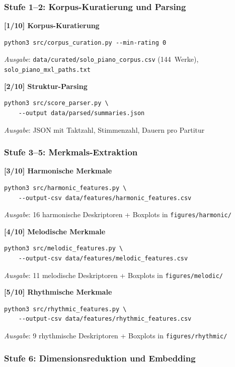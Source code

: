 \documentclass[12pt,a4paper]{article}
\theoremstyle{definition}
\begin{document}
\subsubsection{Stufe 1--2: Korpus-Kuratierung und Parsing}

\textbf{[1/10] Korpus-Kuratierung}
\begin{lstlisting}
python3 src/corpus_curation.py --min-rating 0
\end{lstlisting}
\textit{Ausgabe}: \texttt{data/curated/solo\_piano\_corpus.csv} (144~Werke), \newline\texttt{solo\_piano\_mxl\_paths.txt}

\textbf{[2/10] Struktur-Parsing}
\begin{lstlisting}
python3 src/score_parser.py \
    --output data/parsed/summaries.json
\end{lstlisting}
\textit{Ausgabe}: JSON mit Taktzahl, Stimmenzahl, Dauern pro Partitur

\subsubsection{Stufe 3--5: Merkmals-Extraktion}

\textbf{[3/10] Harmonische Merkmale}
\begin{lstlisting}
python3 src/harmonic_features.py \
    --output-csv data/features/harmonic_features.csv
\end{lstlisting}
\textit{Ausgabe}: 16 harmonische Deskriptoren + Boxplots in \texttt{figures/harmonic/}

\textbf{[4/10] Melodische Merkmale}
\begin{lstlisting}
python3 src/melodic_features.py \
    --output-csv data/features/melodic_features.csv
\end{lstlisting}
\textit{Ausgabe}: 11 melodische Deskriptoren + Boxplots in \texttt{figures/melodic/}

\textbf{[5/10] Rhythmische Merkmale}
\begin{lstlisting}
python3 src/rhythmic_features.py \
    --output-csv data/features/rhythmic_features.csv
\end{lstlisting}
\textit{Ausgabe}: 9 rhythmische Deskriptoren + Boxplots in \texttt{figures/rhythmic/}

\subsubsection{Stufe 6: Dimensionsreduktion und Embedding}
\end{document}
